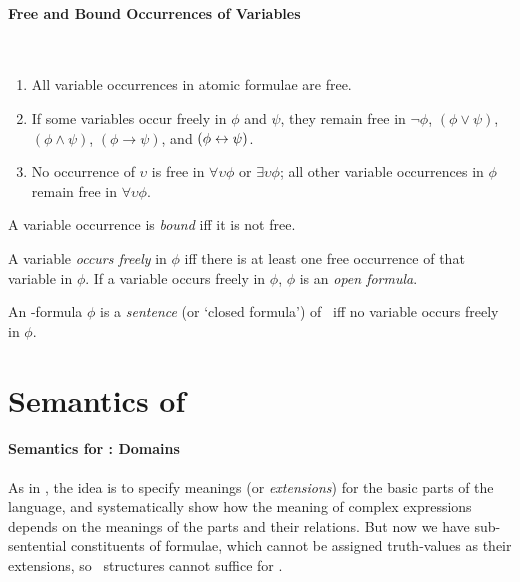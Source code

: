 \paragraph{Free and Bound Occurrences of Variables}

\begin{definition}~
	
\begin{enumerate}
	\item All variable occurrences in atomic formulae are free.
	\item If some variables occur freely in $\phi$ and $\psi$, they remain free in $\neg\phi$, $(\phi\vee\psi)$, $(\phi\wedge\psi)$, $(\phi\to\psi)$, and $(\phi\leftrightarrow\psi)$. 
	\item No occurrence of $\upsilon$ is free in $\forall \upsilon \phi$ or $\exists \upsilon \phi$; all other variable occurrences in $\phi$ remain free in $\forall \upsilon \phi$. 
\end{enumerate}
A variable occurrence is \emph{bound} iff it is not free.
\end{definition}

A variable \emph{occurs freely} in $\phi$ iff there is at least one free occurrence of that variable in $\phi$. If a variable occurs freely in $\phi$, $\phi$ is an \emph{open formula}.

\begin{definition}
An \ltwo-formula	$\phi$ is a \emph{sentence} (or `closed formula') of \ltwo\ iff no variable occurs freely in $\phi$. 
\end{definition}  


\section{Semantics of \texorpdfstring{\ltwo}{L2}} \label{semltwo}
\paragraph{Semantics for \ltwo: Domains}

As in \lone, the idea is to specify meanings (or \emph{extensions}) for the basic parts of the language, and systematically show how the meaning of complex expressions depends on the meanings of the parts and their relations. But now we have sub-sentential constituents of formulae, which cannot be assigned truth-values as their extensions, so \lone\ structures cannot suffice for \ltwo.


